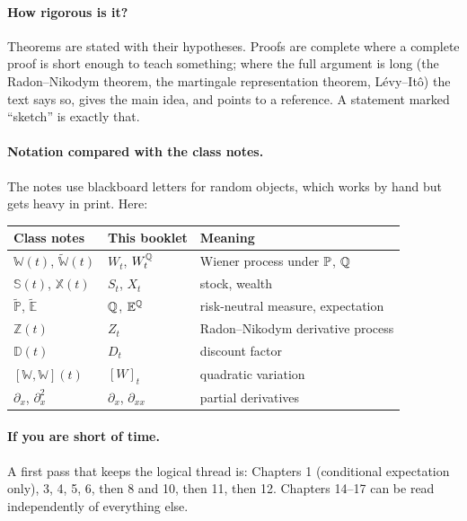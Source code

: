 \paragraph{How rigorous is it?} Theorems are stated with their hypotheses. Proofs are complete where a complete proof is short enough to teach something; where the full argument is long (the Radon--Nikodym theorem, the martingale representation theorem, Lévy--It\^o) the text says so, gives the main idea, and points to a reference. A statement marked ``sketch'' is exactly that.

\paragraph{Notation compared with the class notes.} The notes use blackboard letters for random objects, which works by hand but gets heavy in print. Here:

\begin{center}
\begin{tabular}{lll}
\toprule
Class notes & This booklet & Meaning\\
\midrule
$\mathbb{W}(t)$, $\tilde{\mathbb{W}}(t)$ & $W_t$, $W^{\mathbb{Q}}_t$ & Wiener process under $\mathbb{P}$, $\mathbb{Q}$\\
$\mathbb{S}(t)$, $\mathbb{X}(t)$ & $S_t$, $X_t$ & stock, wealth\\
$\tilde{\mathbb{P}}$, $\tilde{\mathbb{E}}$ & $\mathbb{Q}$, $\mathbb{E}^{\mathbb{Q}}$ & risk-neutral measure, expectation\\
$\mathbb{Z}(t)$ & $Z_t$ & Radon--Nikodym derivative process\\
$\mathbb{D}(t)$ & $D_t$ & discount factor\\
$[\mathbb{W},\mathbb{W}](t)$ & $[W]_t$ & quadratic variation\\
$\partial_x$, $\partial_x^2$ & $\partial_x$, $\partial_{xx}$ & partial derivatives\\
\bottomrule
\end{tabular}
\end{center}

\paragraph{If you are short of time.} A first pass that keeps the logical thread is: Chapters 1 (conditional expectation only), 3, 4, 5, 6, then 8 and 10, then 11, then 12. Chapters 14--17 can be read independently of everything else.
